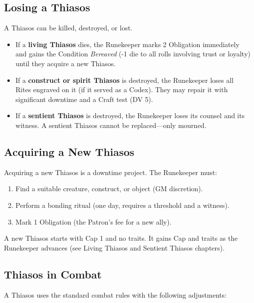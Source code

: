 \subsection{Losing a Thiasos}

A Thiasos can be killed, destroyed, or lost.

\begin{itemize}
\item If a \textbf{living Thiasos} dies, the Runekeeper marks 2 Obligation immediately and gains the Condition \textit{Bereaved} (-1 die to all rolls involving trust or loyalty) until they acquire a new Thiasos.
\item If a \textbf{construct or spirit Thiasos} is destroyed, the Runekeeper loses all Rites engraved on it (if it served as a Codex). They may repair it with significant downtime and a Craft test (DV 5).
\item If a \textbf{sentient Thiasos} is destroyed, the Runekeeper loses its counsel and its witness. A sentient Thiasos cannot be replaced—only mourned.
\end{itemize}

\subsection{Acquiring a New Thiasos}

Acquiring a new Thiasos is a downtime project. The Runekeeper must:

\begin{enumerate}
\item Find a suitable creature, construct, or object (GM discretion).
\item Perform a bonding ritual (one day, requires a threshold and a witness).
\item Mark 1 Obligation (the Patron's fee for a new ally).
\end{enumerate}

A new Thiasos starts with Cap 1 and no traits. It gains Cap and traits as the Runekeeper advances (see Living Thiasos and Sentient Thiasos chapters).

\subsection{Thiasos in Combat}

A Thiasos uses the standard combat rules with the following adjustments:

